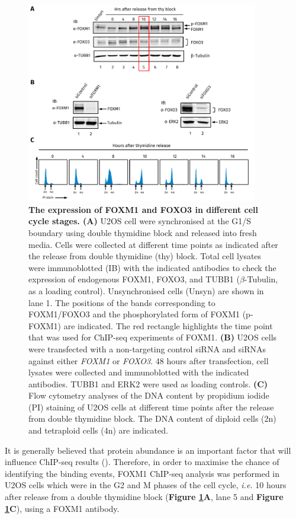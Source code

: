 \begin{figure}[h]
    \centering
    \includegraphics[width=0.9\textwidth]{chapter3/figures_overview/fig10.pdf}
    \caption[The expression of FOXM1 and FOXO3 in different cell cycle stages]{\textbf{The expression of FOXM1 and FOXO3 in different cell cycle stages. (A)} U2OS cell were synchronised at the G1/S boundary using double thymidine block and released into fresh media. Cells were collected at different time points as indicated after the release from double thymidine (thy) block. Total cell lysates were immunoblotted (IB) with the indicated antibodies to check the expression of endogenous FOXM1, FOXO3, and TUBB1 ($\beta$-Tubulin, as a loading control). Unsynchronised cells (Unsyn) are shown in lane 1. The positions of the bands corresponding to FOXM1/FOXO3 and the phosphorylated form of FOXM1 (p-FOXM1) are indicated. The red rectangle highlights the time point that was used for ChIP-seq experiments of FOXM1. \textbf{(B)} U2OS cells were transfected with a non-targeting control siRNA and siRNAs against either \textit{FOXM1} or \textit{FOXO3}. 48 hours after transfection, cell lysates were collected and immunoblotted with the indicated antibodies. TUBB1 and ERK2 were used as loading controls. \textbf{(C)} Flow cytometry analyses of the DNA content by propidium iodide (PI) staining of U2OS cells at different time points after the release from double thymidine block. The DNA content of diploid cells (2n) and tetraploid cells (4n) are indicated.}
    \label{fig:fig10}
\end{figure}

It is generally believed that protein abundance is an important factor that will influence ChIP-seq results (\cite{kidder2011chip-seq:}). Therefore, in order to maximise the chance of identifying the binding events, FOXM1 ChIP-seq analysis was performed in U2OS cells which were in the G2 and M phases of the cell cycle, \textit{i.e.} 10 hours after release from a double thymidine block (\textbf{Figure \ref{fig:fig10}A}, lane 5 and \textbf{Figure \ref{fig:fig10}C}), using a FOXM1 antibody.

